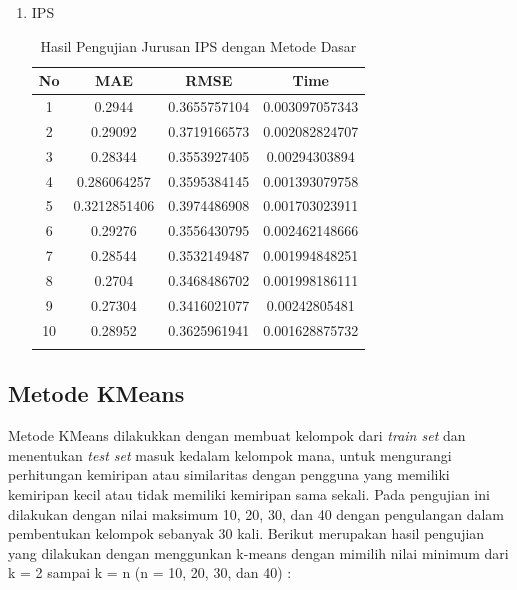\begin{enumerate}
    \item IPS
        \begingroup
        \renewcommand\arraystretch{1.5}
            \begin{longtable}[H]{|c|c|c|c|}
                \hline
                No & MAE & RMSE & Time\\
                \hline
                1 & 0.2944 & 0.3655757104 & 0.003097057343\\
                \hline
                2 & 0.29092 & 0.3719166573 & 0.002082824707\\
                \hline
                3 & 0.28344 & 0.3553927405 & 0.00294303894\\
                \hline
                4 & 0.286064257 & 0.3595384145 & 0.001393079758\\
                \hline
                5 & 0.3212851406 & 0.3974486908 & 0.001703023911\\
                \hline
                6 & 0.29276 & 0.3556430795 & 0.002462148666\\
                \hline
                7 & 0.28544 & 0.3532149487 & 0.001994848251\\
                \hline
                8 & 0.2704 & 0.3468486702 & 0.001998186111\\
                \hline
                9 & 0.27304 & 0.3416021077 & 0.00242805481\\
                \hline
                10 & 0.28952 & 0.3625961941 & 0.001628875732\\
                \hline
                
                \caption{Hasil Pengujian Jurusan IPS dengan Metode Dasar}
                \label{tab:pengujian ips dasar}
            \end{longtable}
        \endgroup
        
\end{enumerate}

\subsection{Metode KMeans}
\label{subsec: metode kmeans}

Metode KMeans dilakukkan dengan membuat kelompok dari \textit{train set} dan menentukan \textit{test set} masuk kedalam kelompok mana, untuk mengurangi perhitungan kemiripan atau similaritas dengan pengguna yang memiliki kemiripan kecil atau tidak memiliki kemiripan sama sekali. Pada pengujian ini dilakukan dengan nilai maksimum 10, 20, 30, dan 40 dengan pengulangan dalam pembentukan kelompok sebanyak 30 kali. Berikut merupakan hasil pengujian yang dilakukan dengan menggunkan k-means dengan mimilih nilai minimum dari k = 2 sampai k = n (n = 10, 20, 30, dan 40) :

